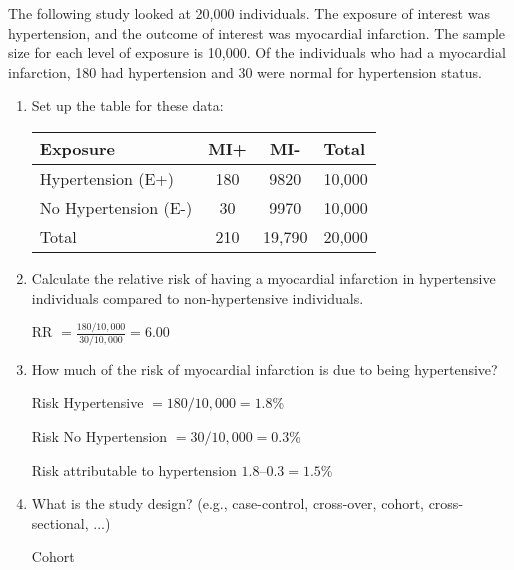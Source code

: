 
The following study looked at 20,000 individuals.  The exposure of interest was hypertension, and the outcome of interest was myocardial infarction.  The sample size for each level of exposure is 10,000.  Of the individuals who had a myocardial infarction, 180 had hypertension and 30 were normal for hypertension status.  

\begin{enumerate}
\item Set up the table for these data:

\answerSpace{4cm}
\begin{AnswerText}
\begin{tabular}{l|cc|l}
Exposure &	MI+ & 	MI- & 	Total \\\hline
Hypertension (E+) & 	180	& 9820 &	10,000\\
No Hypertension (E-) &	30	& 9970 &	10,000\\\hline
Total & 	210	& 19,790 & 	20,000\\
\end{tabular}
\end{AnswerText}


\item Calculate the relative risk of having a myocardial infarction in hypertensive individuals compared to non-hypertensive individuals.

\answerSpace{2cm}

\begin{AnswerText}
RR $= \frac{180/10,000}{30/10,000} = 6.00 $
\end{AnswerText}

\item How much of the risk of myocardial infarction is due to being hypertensive?
\answerSpace{3cm}


\begin{AnswerText}
Risk Hypertensive $= 180/10,000 = 1.8$\%

Risk No Hypertension $= 30/10,000 = 0.3$\%
 
Risk attributable to hypertension $ 1.8 – 0.3 = 1.5$\%
\end{AnswerText}

\item What is the study design? (e.g., case-control, cross-over, cohort, cross-sectional, ...)
\answerSpace{1cm}

\begin{AnswerText}
Cohort
\end{AnswerText}



\end{enumerate}